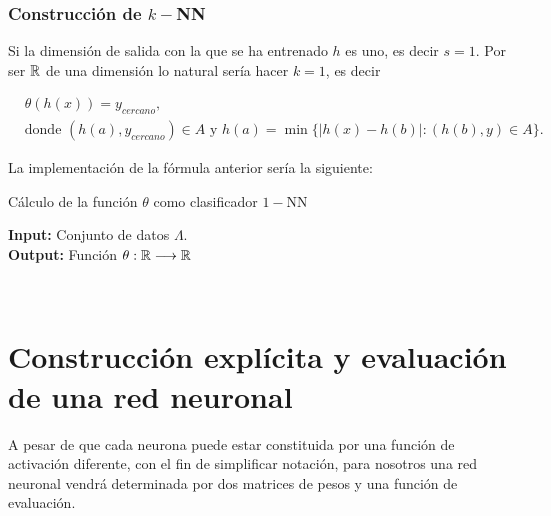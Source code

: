 \subsubsection*{Construcción de $k-$NN}  

Si la dimensión de salida con la que se ha entrenado $h$ es uno, es decir $s=1$. Por ser $\mathbb{R}$ de una dimensión lo natural sería hacer $k=1$, es decir 

\begin{align}
    & \theta(h(x)) = y_{cercano}, \\
    &\text{donde } 
    (h(a),  y_{cercano}) \in A 
    \text{ y }
    h(a) = \min \{|h(x) - h(b)| :  (h(b),  y) \in A  \}.
\end{align}

La implementación de la fórmula anterior sería la siguiente: 

\begin{algorithm}[H]
   \caption{ Cálculo de la función $\theta$ como clasificador $1-$NN} 
   \textbf{Input: } Conjunto de datos $\Lambda$.  \\
   \textbf{Output: } Función $\theta : \mathbb{R} \longrightarrow \mathbb{R}$
   \begin{algorithmic}[1]
    \STATE {} \\
    \Return{$\theta$}
   \end{algorithmic}
\end{algorithm}



\section{Construcción explícita y evaluación de una red neuronal}
\label{ch05:construction-evaluation-nnnn}

A pesar de que cada neurona puede estar constituida 
por una función de activación diferente, con el fin de 
simplificar notación, para nosotros una red neuronal 
vendrá determinada  por    dos matrices de pesos y una función de evaluación. 

